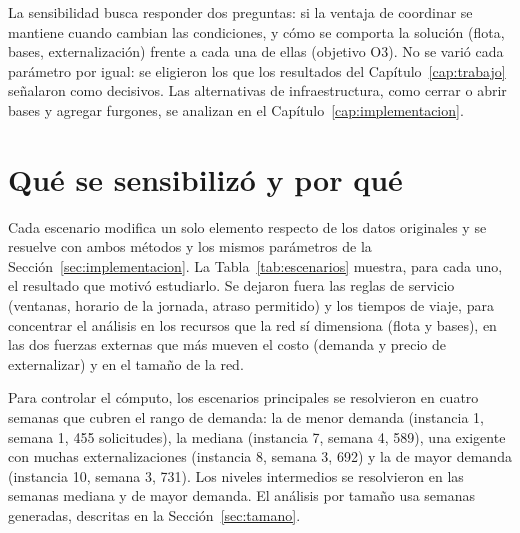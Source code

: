 La sensibilidad busca responder dos preguntas: si la ventaja de coordinar se mantiene cuando cambian las condiciones, y cómo se comporta la solución (flota, bases, externalización) frente a cada una de ellas (objetivo O3). No se varió cada parámetro por igual: se eligieron los que los resultados del Capítulo~\ref{cap:trabajo} señalaron como decisivos. Las alternativas de infraestructura, como cerrar o abrir bases y agregar furgones, se analizan en el Capítulo~\ref{cap:implementacion}.

\section{Qué se sensibilizó y por qué}\label{sec:sensibilidad}

Cada escenario modifica un solo elemento respecto de los datos originales y se resuelve con ambos métodos y los mismos parámetros de la Sección~\ref{sec:implementacion}. La Tabla~\ref{tab:escenarios} muestra, para cada uno, el resultado que motivó estudiarlo. Se dejaron fuera las reglas de servicio (ventanas, horario de la jornada, atraso permitido) y los tiempos de viaje, para concentrar el análisis en los recursos que la red sí dimensiona (flota y bases), en las dos fuerzas externas que más mueven el costo (demanda y precio de externalizar) y en el tamaño de la red.

Para controlar el cómputo, los escenarios principales se resolvieron en cuatro semanas que cubren el rango de demanda: la de menor demanda (instancia 1, semana 1, 455 solicitudes), la mediana (instancia 7, semana 4, 589), una exigente con muchas externalizaciones (instancia 8, semana 3, 692) y la de mayor demanda (instancia 10, semana 3, 731). Los niveles intermedios se resolvieron en las semanas mediana y de mayor demanda. El análisis por tamaño usa semanas generadas, descritas en la Sección~\ref{sec:tamano}.

